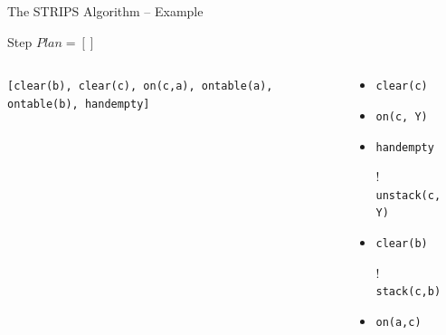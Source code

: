\documentclass[presentation]{beamer}\mode<presentation>{\usetheme{AMSBolognaFC}}
\begin{document}
\begin{frame}[c]{The STRIPS Algorithm -- Example}
\small

	\begin{exampleblock}{Step \nextStripsExampleStep{} \hfill $Plan = []$}
		\begin{columns}[t]
			\begin{column}{.30\linewidth}\centering
				\texttt{[clear(b), \alert{clear(c)}, on(c,a), ontable(a), ontable(b), handempty]}
			\end{column}
			\begin{column}{.50\linewidth}\centering
				\begin{itemize}
					\item \alert{\texttt{clear(c)}}
					\item \texttt{on(c, Y)}
					\item \texttt{handempty}
					\item[!] \texttt{unstack(c, Y)}
					\item \texttt{clear(b)}
					\item[!] \texttt{stack(c,b)}
					\item \texttt{on(a,c)}
				\end{itemize}
			\end{column}
			\begin{column}{.10\linewidth}\centering
				
			\end{column}
		\end{columns}
	\end{exampleblock}

\end{frame}
\end{document}
